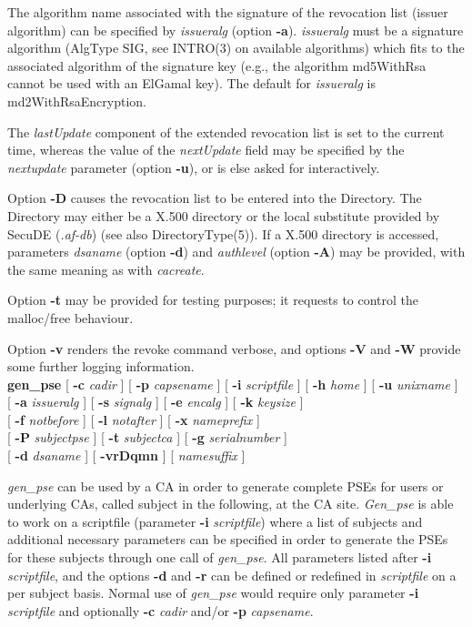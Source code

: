 The algorithm name associated with the signature of the revocation list 
(issuer algorithm) can be specified by {\em issueralg} 
(option {\bf -a}). {\em issueralg} must be a
signature algorithm (AlgType SIG, see INTRO(3) on available algorithms) which fits to the associated 
algorithm of the signature key (e.g., the algorithm md5WithRsa cannot be used with an ElGamal key).
The default for {\em issueralg} is md2WithRsaEncryption.

The {\em lastUpdate} component of the extended revocation list is set to the 
current time, whereas the value of the {\em nextUpdate} field may be specified by the {\em nextupdate} parameter (option {\bf -u}), or is else asked for interactively.
 
Option {\bf -D} causes the revocation list to be entered into the Directory.
The Directory may either be a X.500 directory or the local substitute provided by 
SecuDE ({\em .af-db}) (see also DirectoryType(5)).
If a X.500 directory is accessed, parameters {\em dsaname} (option {\bf -d}) and {\em authlevel} 
(option {\bf -A}) may be provided, with the same meaning as with {\em cacreate}.

Option {\bf -t} may be provided for testing purposes; it requests to control the malloc/free behaviour.

Option {\bf -v} renders the revoke command verbose, and options {\bf -V} and {\bf -W} provide 
some further logging information.
\\ [1em]
{\bf gen\_pse} [ {\bf -c} {\em cadir} ] [ {\bf -p} {\em capsename} ] [ {\bf -i} {\em scriptfile} ] [ {\bf -h} {\em 
home} ] [ {\bf -u} {\em unixname} ] \\ 
\hspace*{2cm} [ {\bf -a} {\em issueralg} ] [ {\bf -s} {\em signalg} ] [ {\bf -e} {\em encalg} ] [ {\bf -k} {\em 
keysize} ] \\ 
\hspace*{2cm} [ {\bf -f} {\em notbefore} ] [ {\bf -l} {\em notafter} ] [ {\bf -x} {\em nameprefix} ]  \\ 
\hspace*{2cm} [ {\bf -P} {\em subjectpse} ] [ {\bf -t} {\em subjectca} ] [ {\bf -g} {\em serialnumber} ] \\
\hspace*{2cm} [ {\bf -d} {\em dsaname} ] [ {\bf -vrDqmn} ] [ {\em namesuffix} ]

{\em gen\_pse} can be used by a CA in order to generate complete PSEs for users or underlying CAs,
called subject in the following, at the CA site. {\em Gen\_pse} is able to work on a scriptfile
(parameter {\bf -i} {\em scriptfile}) where a list of subjects and additional necessary
parameters can be specified in order to generate the PSEs for these subjects through one
call of {\em gen\_pse}. All parameters listed after {\bf -i} {\em scriptfile}, and the
options {\bf -d} and {\bf -r} can be defined or redefined in {\em scriptfile} on a per subject
basis. Normal use of {\em gen\_pse} would require only parameter {\bf -i} {\em scriptfile}
and optionally {\bf -c} {\em cadir} and/or {\bf -p} {\em capsename}.

